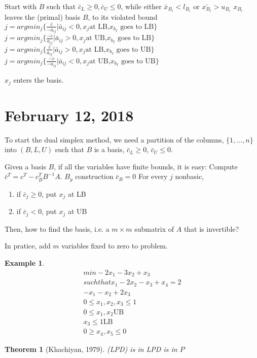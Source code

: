 \documentclass{article}
\theoremstyle{plain}
\newtheorem{thm}{Theorem}
\theoremstyle{definition}
\newtheorem{eg}{Example}
\begin{document}
Start with $B$ such that $\bar{c}_L \geq 0, \bar{c}_U\leq 0$,
while either $\bar{x}_{B_i} < l_{B_i}$ or $\bar{x_{B_i}} > u_{B_i}$
$x_{B_i}$ leaves the (primal) basis $B$, to its violated bound
$j = argmin_j\{\frac{\bar{c}}{-\bar{a}_{ij}}| \bar{a}_{ij} < 0, x_j \text{at LB,
$x_{b_I}$ goes to LB}\}$
$j = argmin_j\{\frac{\bar{-c}}{\bar{a}_{ij}}| \bar{a}_{ij} > 0, x_j \text{at UB,
$x_{b_I}$ goes to LB}\}$
$j = argmin_j\{\frac{\bar{c}}{\bar{a}_{ij}}| \bar{a}_{ij} > 0, x_j \text{at LB,
$x_{b_I}$ goes to UB}\}$
$j = argmin_j\{\frac{\bar{-c}}{\bar{-a}_{ij}}| \bar{a}_{ij} < 0, x_j \text{at UB,
$x_{b_I}$ goes to UB}\}$

$x_j$ enters the basis.

\section{February 12, 2018}
To start the dual simplex method, we need a partition of the columns,
$\{1, ..., n\}$ into $(B, L, U)$ such that $B$ is a basis,
$\bar{c}_L \geq 0$, $\bar{c}_U \leq 0$.


Given a basis $B$, if all the variables have finite bounds, it is easy:
Compute $\bar{c}^T = c^T - c_B^TB^{-1}A$. $B_y$ construction $\bar{c}_B = 0$
For every $j$ nonbasic,
\begin{enumerate}
    \item if $\bar{c}_j \geq 0$, put $x_j$ at LB
    \item if $\bar{c}_j < 0$, put $x_j$ at UB
\end{enumerate}

Then, how to find the basis, i.e. a $m\times m$ submatrix of $A$ that
is invertible?

In pratice, add $m$ variables fixed to zero to problem.
\begin{eg}
    \begin{align*}
        min -2x_1 - 3x_2 + x_3\\
        such that x_1 - 2x_2 - x_3 + x_4 = 2\\
        -x_1 - x_2 + 2x_3\\
        0 \leq x_1, x_2, x_3 \leq 1\\
        0\leq x_1, x_2 \text{UB}\\
        x_3 \leq 1 \text{LB}\\
        0\geq x_4, x_5 \leq 0
    \end{align*}
\end{eg}

\begin{thm}[Khachiyan, 1979]
    (LPD) is in LPD is in $P$
\end{thm}
\end{document}
